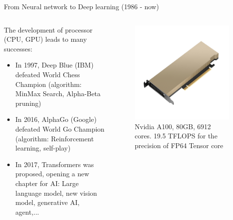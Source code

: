 \begin{frame}{From Neural network to Deep learning (1986 - now)}

    \begin{columns}
        \begin{column}{0.6\textwidth}
            \alert{The development of processor} (CPU, GPU) leads to many successes:
            \begin{itemize}
                \item In 1997, Deep Blue (IBM) defeated World Chess Champion (algorithm: MinMax Search, Alpha-Beta pruning)
                \item In 2016, AlphaGo (Google) defeated World Go Champion (algorithm: Reinforcement learning, self-play)
                \item In 2017, \alert{Transformers} was proposed, opening a new chapter for AI: Large language model, new vision model, generative AI, agent,...
            \end{itemize}
        \end{column}

        \begin{column}{0.4\textwidth}
            \begin{figure}
                \centering
                \includegraphics[width=0.8\linewidth]{img/nvidia_a100.png}
                \caption{Nvidia A100, 80GB, 6912 cores. 19.5 TFLOPS for the precision of FP64 Tensor core}
            \end{figure}
        \end{column}
    \end{columns}
\end{frame}

